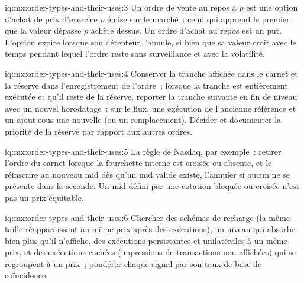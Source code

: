 \begin{solution}{iq:mx:order-types-and-their-uses:3}
Un ordre de vente au repos à $p$ est une option d'achat de prix d'exercice $p$ émise sur le marché~: celui qui apprend le premier que la valeur dépasse $p$ achète dessus. Un ordre d'achat au repos est un put.
L'option expire lorsque son détenteur l'annule, si bien que sa valeur croît avec le temps pendant lequel l'ordre reste sans surveillance et avec la volatilité. 
\end{solution}

\begin{solution}{iq:mx:order-types-and-their-uses:4}
Conserver la tranche affichée dans le carnet et la réserve dans l'enregistrement de l'ordre~; lorsque la tranche est entièrement exécutée et qu'il reste de la réserve, reporter la tranche suivante en
fin de niveau avec un nouvel horodatage~; sur le flux, une exécution de l'ancienne référence et un ajout sous une nouvelle (ou un remplacement). Décider et
documenter la priorité de la réserve par rapport aux autres ordres. 
\end{solution}

\begin{solution}{iq:mx:order-types-and-their-uses:5}
La règle de Nasdaq, par exemple~: retirer l'ordre du carnet lorsque la fourchette interne est croisée ou absente, et le réinscrire au nouveau mid dès qu'un mid valide existe,
l'annuler si aucun ne se présente dans la seconde. Un mid défini par une cotation bloquée ou croisée n'est pas un prix équitable. 
\end{solution}

\begin{solution}{iq:mx:order-types-and-their-uses:6}
Chercher des schémas de recharge (la même taille réapparaissant au même prix après des exécutions), un niveau qui absorbe bien plus qu'il n'affiche, des
exécutions persistantes et unilatérales à un même prix, et des exécutions cachées (impressions de transactions non affichées) qui se regroupent à un prix~; pondérer chaque signal par son taux de base de
coïncidence. 
\end{solution}
